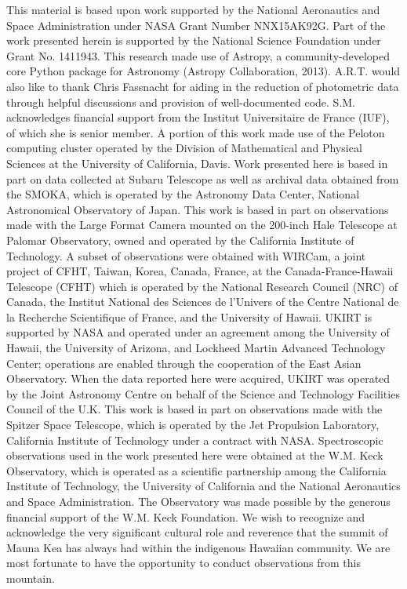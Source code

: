 \documentclass[a4paper,fleqn,usenatbib]{mnras}
\begin{document}
This material is based upon work supported by the National Aeronautics and Space Administration under NASA Grant Number NNX15AK92G.
Part of the work presented herein is supported by the National Science Foundation under Grant No. 1411943.
This research made use of Astropy, a community-developed core Python package for Astronomy (Astropy Collaboration, 2013).
A.R.T. would also like to thank Chris Fassnacht for aiding in the reduction of photometric data through helpful discussions and provision of well-documented code.
S.M. acknowledges financial support from the Institut Universitaire de France (IUF), of which she is senior member.
A portion of this work made use of the Peloton computing cluster operated by the Division of Mathematical and Physical Sciences at the University of California, Davis.
Work presented here is based in part on data collected at Subaru Telescope as well as archival data obtained from the SMOKA, which is operated by the Astronomy Data Center, National Astronomical Observatory of Japan.
This work is based in part on observations made with the Large Format Camera mounted on the 200-inch Hale Telescope at Palomar Observatory, owned and operated by the California Institute of Technology.
A subset of observations were obtained with WIRCam, a joint project of CFHT, Taiwan, Korea, Canada, France, at the Canada-France-Hawaii Telescope (CFHT) which is operated by the National Research Council (NRC) of Canada, the Institut National des Sciences de l'Univers of the Centre National de la Recherche Scientifique of France, and the University of Hawaii.
UKIRT is supported by NASA and operated under an agreement among the University of Hawaii, the University of Arizona, and Lockheed Martin Advanced Technology Center; operations are enabled through the cooperation of the East Asian Observatory.
When the data reported here were acquired, UKIRT was operated by the Joint Astronomy Centre on behalf of the Science and Technology Facilities Council of the U.K. 
This work is based in part on observations made with the Spitzer Space Telescope, which is operated by the Jet Propulsion Laboratory, California Institute of Technology under a contract with NASA.
Spectroscopic observations used in the work presented here were obtained at the W.M. Keck Observatory, which is operated as a scientific partnership among the California Institute of Technology, the University of California and the National Aeronautics and Space Administration.
The Observatory was made possible by the generous financial support of the W.M. Keck Foundation.
We wish to recognize and acknowledge the very significant cultural role and reverence that the summit of Mauna Kea has always had within the indigenous Hawaiian community.
We are most fortunate to have the opportunity to conduct observations from this mountain.
\end{document}
